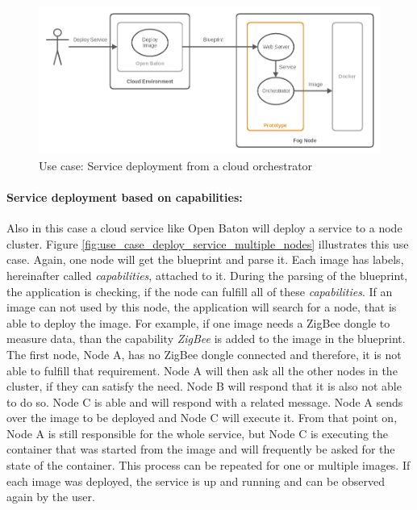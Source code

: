 \begin{figure}[H]
    \centering
    \includegraphics[width=\textwidth]{resources/images/use_case_deploy_service.png}
    \caption[Use case: Service deployment from a cloud orchestrator]{Use case: Service deployment from a cloud orchestrator}
    \label{fig:use_case_deploy_service}
\end{figure}

\paragraph{Service deployment based on capabilities:}
Also in this case a cloud service like Open Baton will deploy a service to a node cluster.
Figure \ref{fig:use_case_deploy_service_multiple_nodes} illustrates this use case.
Again, one node will get the blueprint and parse it.
Each image has labels, hereinafter called \textit{capabilities}, attached to it.
During the parsing of the blueprint, the application is checking, if the node can fulfill all of these \textit{capabilities}.
If an image can not used by this node, the application will search for a node, that is able to deploy the image.
For example, if one image needs a ZigBee dongle to measure data, than the capability \textit{ZigBee} is added to the image in the blueprint.
The first node, Node A, has no ZigBee dongle connected and therefore, it is not able to fulfill that requirement.
Node A will then ask all the other nodes in the cluster, if they can satisfy the need.
Node B will respond that it is also not able to do so.
Node C is able and will respond with a related message.
Node A sends over the image to be deployed and Node C will execute it.
From that point on, Node A is still responsible for the whole service, but Node C is executing the container that was started from the image and will frequently be asked for the state of the container.
This process can be repeated for one or multiple images.
If each image was deployed, the service is up and running and can be observed again by the user.

